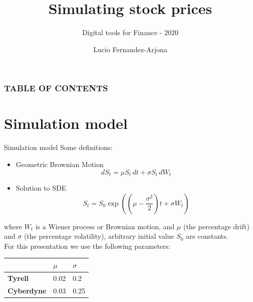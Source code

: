 \documentclass[9pt]{beamer}
\title{Simulating stock prices}
\subtitle{Digital tools for Finance - 2020}
\author{Lucio Fernandez-Arjona}
\institute{}
\begin{document}
\titlepage

\begin{frame}

 \frametitle{TABLE OF CONTENTS}
 \tableofcontents
\end{frame}

\section{Simulation model} %
\begin{frame}{Simulation model}%
Some definitions: 
\begin{itemize}
    \item Geometric Brownian Motion \[dS_{t}=\mu S_{t}\,dt+\sigma S_{t}\,dW_{t}\]
    
    \item Solution to SDE \[S_{t}=S_{0}\exp \left(\left(\mu -{\frac {\sigma ^{2}}{2}}\right)t+\sigma W_{t}\right)\]

\end{itemize}

where $W_{t}$ is a Wiener process or Brownian motion, and $\mu$  (the percentage drift) and $\sigma$  (the percentage volatility), arbitrary initial value $S_0$ are constants.\\

For this presentation we use the following parameters:
\begin{table}[]
\centering
\label{table}
\begin{tabular}{lll}
\toprule
                   & $\mu$ & $\sigma$ \\ 
\midrule
\textbf{Tyrell}    & 0.02         & 0.2             \\ 
\textbf{Cyberdyne} & 0.03         & 0.25            \\ 
\bottomrule
\end{tabular}
\end{table}
\end{frame}
\end{document}
